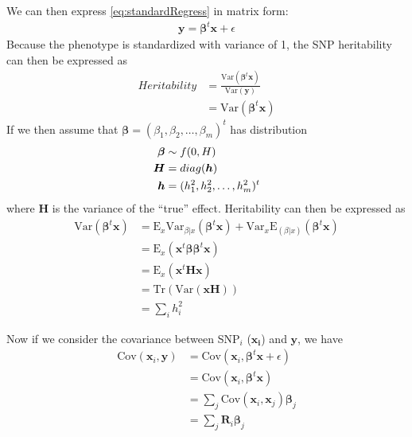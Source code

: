 			We can then express \cref{eq:standardRegress} in matrix form:
			\begin{align}
				\boldsymbol{y}=\boldsymbol{\beta}^t\boldsymbol{x}+\epsilon
				\label{eq:matrixRegress}
			\end{align}
			Because the phenotype is standardized with variance of 1, the \gls{SNP} heritability can then be expressed as
			\begin{align}
				Heritability& = \frac{\mathrm{Var}(\boldsymbol{\beta}^t\boldsymbol{x})}{\mathrm{Var}(\boldsymbol{y})} \nonumber\\
				&=\mathrm{Var}(\boldsymbol{\beta}^t\boldsymbol{x})
			\end{align}
			If we then assume that $\boldsymbol{\beta} = (\beta_1, \beta_2,\dots,\beta_m)^t$ has distribution
			\begin{align*}
				\boldsymbol{\beta}&\sim f(0,\boldmath{H})\\
				\boldsymbol{H}&=diag(\boldsymbol{h})\\
				\boldsymbol{h}&=(h_1^2,h_2^2,\dots,h_m^2)^t
			\end{align*}
			where $\boldsymbol{H}$ is the variance of the ``true'' effect. 
			Heritability can then be expressed as %
			\begin{align}
			\mathrm{Var}(\boldsymbol{\beta}^t\boldsymbol{x}) &= \mathrm{E}_x\mathrm{Var}_{\beta|x}(\boldsymbol{\beta}^t\boldsymbol{x})+\mathrm{Var}_x\mathrm{E}_{(\beta|x)}(\boldsymbol{\beta}^t\boldsymbol{x}) \nonumber\\
			&=\mathrm{E}_x(\boldsymbol{x}^t\boldsymbol{\beta\beta}^t\boldsymbol{x}) \nonumber\\ 
			&= \mathrm{E}_x(\boldsymbol{x}^t\boldsymbol{Hx}) \nonumber\\
			&=\mathrm{Tr}(\mathrm{Var}(\boldsymbol{x}\boldsymbol{H})) \nonumber\\
			&=\sum_ih_i^2
			\label{eq:proveHerit}
			\end{align}
			
			Now if we consider the covariance between \gls{SNP}$_i$ ($\boldsymbol{x_i}$) and $\boldsymbol{y}$, we have
			\begin{align}
			 \mathrm{Cov}(\boldsymbol{x}_i,\boldsymbol{y}) &= \mathrm{Cov}(\boldsymbol{x}_i,\boldsymbol{\beta}^t\boldsymbol{x}+\epsilon) \nonumber\\
			 &=\mathrm{Cov}(\boldsymbol{x}_i,\boldsymbol{\beta}^t\boldsymbol{x}) \nonumber\\
			 &=\sum_j{\mathrm{Cov}(\boldsymbol{x}_i,\boldsymbol{x}_j)\boldsymbol{\beta}_j} \nonumber\\
			 &=\sum_j{\boldsymbol{R}_i\boldsymbol{\beta}_j}
			 \label{eq:covPhenoTrue}
			\end{align}
			
